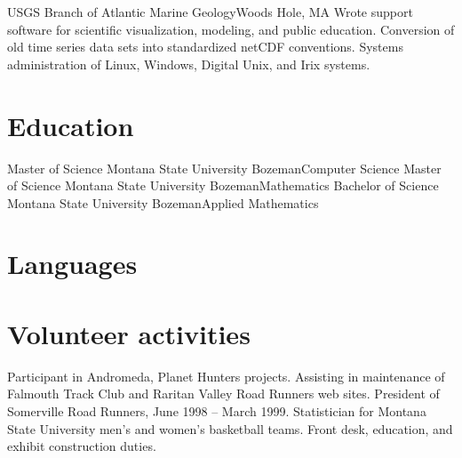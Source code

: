 \documentclass[11pt]{moderncv}  %
\begin{document}
    {USGS Branch of Atlantic Marine Geology}{Woods Hole, MA}{}{
    Wrote support software for scientific visualization, modeling,
    and public education. Conversion of old time series data sets
    into standardized netCDF conventions.  Systems administration
    of Linux, Windows, Digital Unix, and Irix systems.}

\section{Education}
    {Master of Science}
    {Montana State University}
    {Bozeman}{}{Computer Science}
    {Master of Science}
    {Montana State University}
    {Bozeman}{}{Mathematics}
    {Bachelor of Science}
    {Montana State University}
    {Bozeman}{}{Applied Mathematics}

\section{Languages}

\section{Volunteer activities}
  {Participant in Andromeda, Planet Hunters projects.}
  {Assisting in maintenance of Falmouth Track Club and Raritan Valley
   Road Runners web sites.
   President of Somerville Road Runners, June 1998 -- March 1999.}
  {Statistician for Montana State University men's and women's basketball
  teams.}
  {Front desk, education, and exhibit construction duties.}

\end{document}
